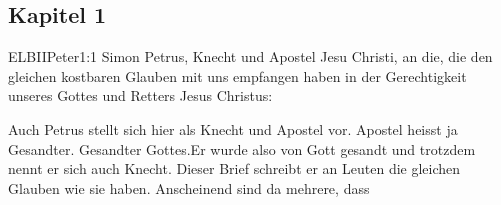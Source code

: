 \subsection{Kapitel 1}
\begin{bibeltext}{ELB}{IIPeter}{1:1}
    Simon Petrus, Knecht und Apostel Jesu Christi, an die, die den gleichen kostbaren Glauben mit uns empfangen haben in der Gerechtigkeit unseres Gottes und Retters Jesus Christus:
\end{bibeltext}
Auch Petrus stellt sich hier als Knecht und Apostel vor. Apostel heisst ja Gesandter. Gesandter Gottes.Er wurde also von Gott gesandt und trotzdem nennt er sich auch Knecht.
Dieser Brief schreibt er an Leuten die gleichen Glauben wie sie haben. Anscheinend sind da mehrere, dass 